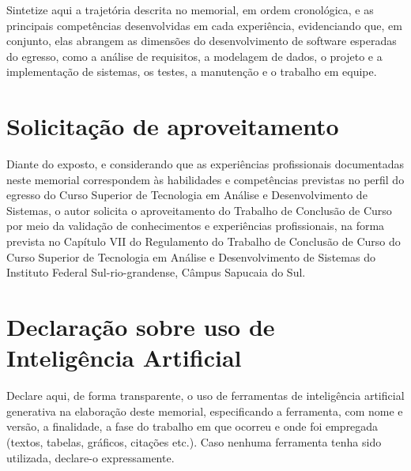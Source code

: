 \documentclass[memorial,capa]{texifsap}
\begin{document}
Sintetize aqui a trajetória descrita no memorial, em ordem cronológica,
e as principais competências desenvolvidas em cada experiência,
evidenciando que, em conjunto, elas abrangem as dimensões do
desenvolvimento de software esperadas do egresso, como a análise de
requisitos, a modelagem de dados, o projeto e a implementação de
sistemas, os testes, a manutenção e o trabalho em equipe.

\section{Solicitação de aproveitamento}

Diante do exposto, e considerando que as experiências profissionais
documentadas neste memorial correspondem às habilidades e competências
previstas no perfil do egresso do Curso Superior de Tecnologia em
Análise e Desenvolvimento de Sistemas, o autor solicita o aproveitamento
do Trabalho de Conclusão de Curso por meio da validação de
conhecimentos e experiências profissionais, na forma prevista no
Capítulo VII do Regulamento do Trabalho de Conclusão de Curso do Curso
Superior de Tecnologia em Análise e Desenvolvimento de Sistemas do
Instituto Federal Sul-rio-grandense, Câmpus Sapucaia do Sul.

\section{Declaração sobre uso de Inteligência Artificial}


Declare aqui, de forma transparente, o uso de ferramentas de
inteligência artificial generativa na elaboração deste memorial,
especificando a ferramenta, com nome e versão, a finalidade, a fase do
trabalho em que ocorreu e onde foi empregada (textos, tabelas, gráficos,
citações etc.). Caso nenhuma ferramenta tenha sido utilizada,
declare-o expressamente.



\end{document}
